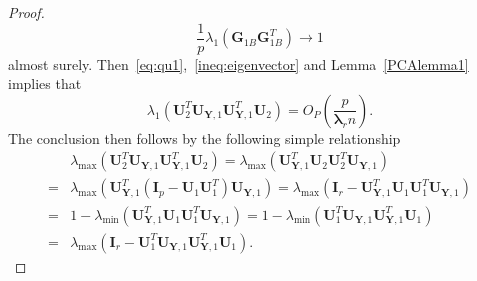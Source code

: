\documentclass[12pt]{article} %
\newcommand{\bY}{\mathbf{Y}}
\newcommand{\bG}{\mathbf{G}}
\newcommand{\bI}{\mathbf{I}}
\newcommand{\bU}{\mathbf{U}}
\newcommand{\bfsym}[1]{\ensuremath{\boldsymbol{#1}}}
\def\blambda {\bfsym {\lambda}}
\theoremstyle{definition}
\begin{document}
\begin{proof}
    \begin{equation}\label{eq:qu1}
    \frac{1}{p}\lambda_1(\bG_{1B}\bG_{1B}^T)\to 1
    \end{equation}
    almost surely.
    Then~\eqref{eq:qu1},~\eqref{ineq:eigenvector} and Lemma~\ref{PCAlemma1} implies that
    $$\lambda_{1}(\bU_{2}^T \bU_{\bY,1} \bU_{\bY,1}^T \bU_{2})=O_P(\frac{p}{\blambda_r n}).
    $$
 The conclusion then follows by the following simple relationship
$$
\begin{aligned}
&\lambda_{\max}(\bU_{2}^T \bU_{\bY,1} \bU_{\bY,1}^T \bU_{2})
=
\lambda_{\max}(\bU_{\bY,1}^T \bU_{2} \bU_{2}^T \bU_{\bY,1})\\
=&
    \lambda_{\max}(\bU_{\bY,1}^T (\bI_p-\bU_{1} \bU_{1}^T) \bU_{\bY,1})
    =
\lambda_{\max}(\bI_r-\bU_{\bY,1}^T\bU_{1} \bU_{1}^T \bU_{\bY,1})\\
=&
1-\lambda_{\min}(\bU_{\bY,1}^T\bU_{1} \bU_{1}^T \bU_{\bY,1})
=
1-\lambda_{\min}( \bU_{1}^T \bU_{\bY,1}\bU_{\bY,1}^T\bU_{1})\\
=&
\lambda_{\max}(\bI_r-\bU_{1}^T \bU_{\bY,1}\bU_{\bY,1}^T\bU_{1}).
\end{aligned}
$$
\end{proof}
\end{document}
